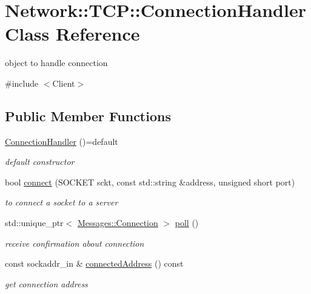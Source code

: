 \hypertarget{class_network_1_1_t_c_p_1_1_connection_handler}{}\section{Network\+:\+:T\+CP\+:\+:Connection\+Handler Class Reference}
\label{class_network_1_1_t_c_p_1_1_connection_handler}


object to handle connection  




{\ttfamily \#include $<$Client$>$}

\subsection*{Public Member Functions}
\begin{DoxyCompactItemize}
\item 
\mbox{\label{class_network_1_1_t_c_p_1_1_connection_handler_af393160b127321472c05855b1c9cecd6}} 
\hyperlink{class_network_1_1_t_c_p_1_1_connection_handler_af393160b127321472c05855b1c9cecd6}{Connection\+Handler} ()=default
\begin{DoxyCompactList}\small\item\em default constructor \end{DoxyCompactList}\item 
bool \hyperlink{class_network_1_1_t_c_p_1_1_connection_handler_ab2a6934f68bb7b9ca6c279130d5bfa25}{connect} (S\+O\+C\+K\+ET sckt, const std\+::string \&address, unsigned short port)
\begin{DoxyCompactList}\small\item\em to connect a socket to a server \end{DoxyCompactList}\item 
std\+::unique\+\_\+ptr$<$ \hyperlink{class_network_1_1_messages_1_1_connection}{Messages\+::\+Connection} $>$ \hyperlink{class_network_1_1_t_c_p_1_1_connection_handler_acada6e8c41b8391d31649393fda5fac2}{poll} ()
\begin{DoxyCompactList}\small\item\em receive confirmation about connection \end{DoxyCompactList}\item 
const sockaddr\+\_\+in \& \hyperlink{class_network_1_1_t_c_p_1_1_connection_handler_a1a52c94072d1b0563b0398f53ec3e8d4}{connected\+Address} () const
\begin{DoxyCompactList}\small\item\em get connection address \end{DoxyCompactList}\end{DoxyCompactItemize}


